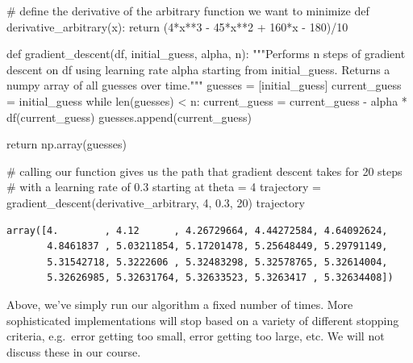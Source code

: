 \documentclass[
  letterpaper,
  DIV=11,
  numbers=noendperiod]{scrreprt}
\newenvironment{Shaded}{\begin{snugshade}}{\end{snugshade}}
\newcommand{\BuiltInTok}[1]{\textcolor[rgb]{0.00,0.23,0.31}{#1}}
\newcommand{\CommentTok}[1]{\textcolor[rgb]{0.37,0.37,0.37}{#1}}
\newcommand{\ControlFlowTok}[1]{\textcolor[rgb]{0.00,0.23,0.31}{#1}}
\newcommand{\DecValTok}[1]{\textcolor[rgb]{0.68,0.00,0.00}{#1}}
\newcommand{\FloatTok}[1]{\textcolor[rgb]{0.68,0.00,0.00}{#1}}
\newcommand{\KeywordTok}[1]{\textcolor[rgb]{0.00,0.23,0.31}{#1}}
\newcommand{\NormalTok}[1]{\textcolor[rgb]{0.00,0.23,0.31}{#1}}
\newcommand{\OperatorTok}[1]{\textcolor[rgb]{0.37,0.37,0.37}{#1}}
\begin{document}
\begin{Shaded}
\begin{Highlighting}[]
\CommentTok{\# define the derivative of the arbitrary function we want to minimize}
\KeywordTok{def}\NormalTok{ derivative\_arbitrary(x):}
    \ControlFlowTok{return}\NormalTok{ (}\DecValTok{4}\OperatorTok{*}\NormalTok{x}\OperatorTok{**}\DecValTok{3} \OperatorTok{{-}} \DecValTok{45}\OperatorTok{*}\NormalTok{x}\OperatorTok{**}\DecValTok{2} \OperatorTok{+} \DecValTok{160}\OperatorTok{*}\NormalTok{x }\OperatorTok{{-}} \DecValTok{180}\NormalTok{)}\OperatorTok{/}\DecValTok{10}

\KeywordTok{def}\NormalTok{ gradient\_descent(df, initial\_guess, alpha, n):}
    \CommentTok{"""Performs n steps of gradient descent on df using learning rate alpha starting}
\CommentTok{       from initial\_guess. Returns a numpy array of all guesses over time."""}
\NormalTok{    guesses }\OperatorTok{=}\NormalTok{ [initial\_guess]}
\NormalTok{    current\_guess }\OperatorTok{=}\NormalTok{ initial\_guess}
    \ControlFlowTok{while} \BuiltInTok{len}\NormalTok{(guesses) }\OperatorTok{\textless{}}\NormalTok{ n:}
\NormalTok{        current\_guess }\OperatorTok{=}\NormalTok{ current\_guess }\OperatorTok{{-}}\NormalTok{ alpha }\OperatorTok{*}\NormalTok{ df(current\_guess)}
\NormalTok{        guesses.append(current\_guess)}
        
    \ControlFlowTok{return}\NormalTok{ np.array(guesses)}

\CommentTok{\# calling our function gives us the path that gradient descent takes for 20 steps }
\CommentTok{\# with a learning rate of 0.3 starting at theta = 4}
\NormalTok{trajectory }\OperatorTok{=}\NormalTok{ gradient\_descent(derivative\_arbitrary, }\DecValTok{4}\NormalTok{, }\FloatTok{0.3}\NormalTok{, }\DecValTok{20}\NormalTok{)}
\NormalTok{trajectory}
\end{Highlighting}
\end{Shaded}

\begin{verbatim}
array([4.        , 4.12      , 4.26729664, 4.44272584, 4.64092624,
       4.8461837 , 5.03211854, 5.17201478, 5.25648449, 5.29791149,
       5.31542718, 5.3222606 , 5.32483298, 5.32578765, 5.32614004,
       5.32626985, 5.32631764, 5.32633523, 5.3263417 , 5.32634408])
\end{verbatim}

Above, we've simply run our algorithm a fixed number of times. More
sophisticated implementations will stop based on a variety of different
stopping criteria, e.g.~error getting too small, error getting too
large, etc. We will not discuss these in our course.
\end{document}
